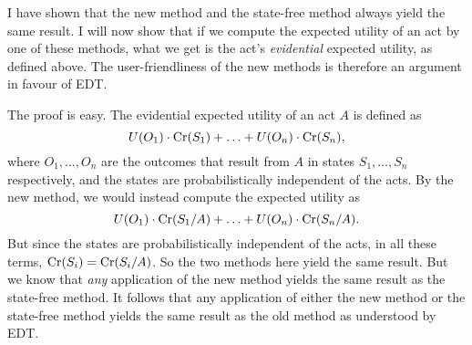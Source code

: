 I have shown that the new method and the state-free method always
yield the same result. I will now show that if we compute the expected
utility of an act by one of these methods, what we get is the act's
\emph{evidential} expected utility, as defined above. The
user-friendliness of the new methods is therefore an argument in
favour of EDT.

The proof is easy. The evidential expected utility of an act $A$ is
defined as
\[
U(O_1) \cdot \text{Cr}(S_1) + \ldots + U(O_n) \cdot \text{Cr}(S_n),
\]
where $O_1,\ldots,O_n$ are the outcomes that result from $A$ in states
$S_1,\ldots,S_n$ respectively, and the states are probabilistically
independent of the acts. By the new method, we would instead compute
the expected utility as
\[
U(O_1) \cdot \text{Cr}(S_1/A) + \ldots + U(O_n) \cdot \text{Cr}(S_n/A).
\]
But since the states are probabilistically independent of the acts, in
all these terms, $\text{Cr}(S_i) = \text{Cr}(S_i/A)$. So the two methods here
yield the same result. But we know that \emph{any} application of the
new method yields the same result as the state-free method. It follows
that any application of either the new method or the state-free method
yields the same result as the old method as understood by EDT.


